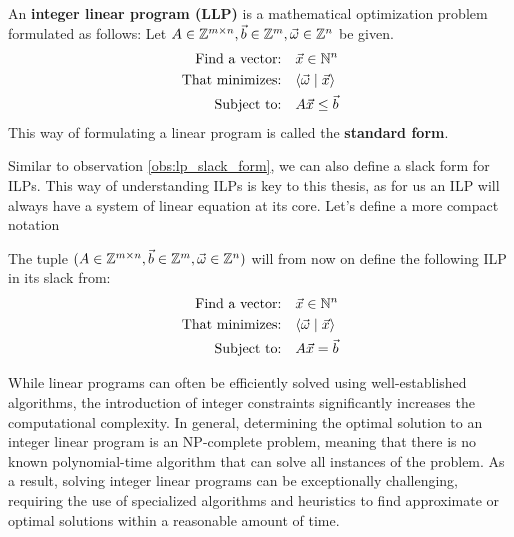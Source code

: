 \begin{definition}
    An \textbf{integer linear program (LLP)} is a mathematical optimization problem formulated as follows: Let $A\in\mathbb{Z}^{m\times n}, \vec b \in \mathbb{Z}^m, \vec\omega \in \mathbb{Z}^n$ be given.
    \begin{align*}
        \text{Find a vector:} & \quad \vec x \in \mathbb{N}^n \\
        \text{That minimizes:} & \quad \langle \vec \omega \mid \vec x \rangle\\
        \text{Subject to:} & \quad A\vec x \leq \vec b \\
    \end{align*}
    This way of formulating a linear program is called the \textbf{standard form}.
\end{definition}
\begin{observation}
    Similar to observation \ref{obs:lp_slack_form}, we can also define a slack form for ILPs. This way of understanding ILPs is key to this thesis, as for us an ILP will always have a system of linear equation at its core. Let's define a more compact notation
\end{observation}

\begin{definition}
    The tuple $(A\in\mathbb{Z}^{m\times n}, \vec b \in \mathbb{Z}^m, \vec\omega \in \mathbb{Z}^n)$ will from now on define the following ILP in its slack from:
    \begin{align*}
        \text{Find a vector:} & \quad \vec x \in \mathbb{N}^n \\
        \text{That minimizes:} & \quad \langle \vec \omega \mid \vec x \rangle\\
        \text{Subject to:} & \quad A\vec x = \vec b \\
    \end{align*}
\end{definition}

While linear programs can often be efficiently solved using well-established algorithms, the introduction of integer constraints significantly increases the computational complexity. In general, determining the optimal solution to an integer linear program is an NP-complete problem, meaning that there is no known polynomial-time algorithm that can solve all instances of the problem. As a result, solving integer linear programs can be exceptionally challenging, requiring the use of specialized algorithms and heuristics to find approximate or optimal solutions within a reasonable amount of time. 